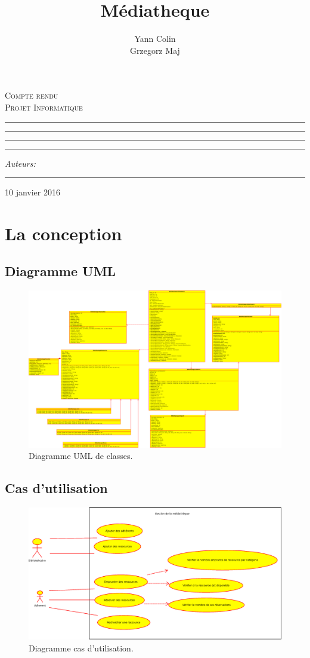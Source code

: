 \documentclass[10pt, a4paper]{article}
\author{Yann Colin \\Grzegorz Maj}
\title{Médiatheque}
\makeatletter
\newcommand{\linia}{\rule{\linewidth}{0.4mm}}
\def\maketitle{%
\begin{titlepage}
	\begin{center}
		\LARGE
		\textsc{Compte rendu \\ Projet Informatique}
	\end{center}

	\vspace{3cm}

	\begin{center}\leavevmode
      \hrule
    \vskip 1pt
	\linia
	\vskip 0.5cm
	\Huge \textsc{\@title}\par

	\vskip 0.5cm
      	\linia
      \vskip 1pt
      \hrule

	\vskip 2mm

	\vspace{1.5cm}
	\begin{flushright}
		\begin{minipage}{5cm}
			\textit{\normalsize Auteurs:}\\
			\Large \textit{\@author} \par
			\vskip 2pt
			\hrule
			
		\end{minipage}
	\end{flushright}
    

	\end{center}%
	\vspace*{\stretch{6}}
    \begin{center}
    10 janvier 2016
    \end{center}
\end{titlepage}
	}
\makeatother
\begin{document}

    \maketitle
    
    \tableofcontents
    \newpage
    
     \section{La conception}
     
	     \subsection{Diagramme UML}
	     
	     \begin{figure}[h]
			\begin{center}
				\includegraphics[width=1\textwidth]{graphics/class.eps}
				\caption{Diagramme UML de classes.}
			\end{center}
		\end{figure}
     
    		 \subsection{Cas d'utilisation}
    		 
    		 \begin{figure}[h]
			\begin{center}
				\includegraphics[width=1\textwidth]{graphics/usecasediagram.eps}
				\caption{Diagramme cas d'utilisation.}
			\end{center}
		\end{figure}
	
\end{document}
